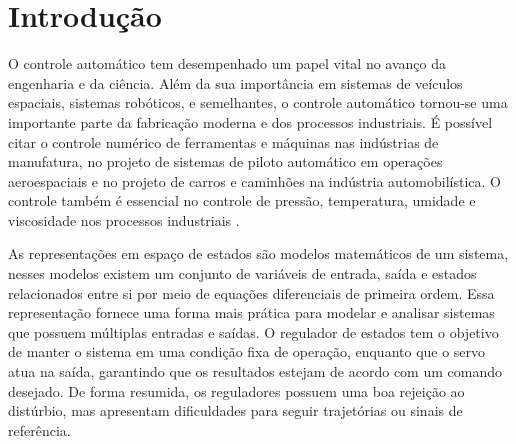 \documentclass[
	12pt,				%
	openany,			%
	oneside,			%
	a4paper,			%
	english,			%
	french,				%
	spanish,			%
	brazil,				%
	]{abntex2}
\begin{document}
{%

\tableofcontents*
\cleardoublepage


\textual

\chapter*[Introdução]{Introdução}

O controle automático tem desempenhado um papel vital no avanço da engenharia e da ciência. Além da sua importância em sistemas de veículos espaciais, sistemas robóticos, e semelhantes, o controle automático tornou-se uma importante parte da fabricação moderna e dos processos industriais. É possível citar o controle numérico de ferramentas e máquinas nas indústrias de manufatura, no projeto de sistemas de piloto automático em operações aeroespaciais e no projeto de carros e caminhões na indústria automobilística. O controle também é essencial no controle de pressão, temperatura, umidade e viscosidade nos processos industriais \cite{ogata}.

As representações em espaço de estados são modelos matemáticos de um sistema, nesses modelos existem um conjunto de variáveis de entrada, saída e estados relacionados entre si por meio de equações diferenciais de primeira ordem. Essa representação fornece uma forma mais prática para modelar e analisar sistemas que possuem múltiplas entradas e saídas. O regulador de estados tem o objetivo de manter o sistema em uma condição fixa de operação, enquanto que o servo atua na saída, garantindo que os resultados estejam de acordo com um comando desejado. De forma resumida, os reguladores possuem uma boa rejeição ao distúrbio, mas apresentam dificuldades para seguir trajetórias ou sinais de referência.


}
\end{document}
